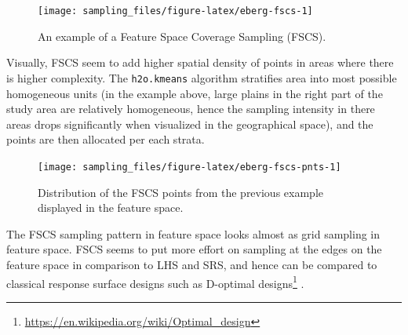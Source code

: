 \documentclass[
  graybox,natbib,nospthms]{svmono}
\newenvironment{Shaded}{\begin{snugshade}}{\end{snugshade}}
\newcommand{\AttributeTok}[1]{\textcolor[rgb]{0.61,0.61,0.61}{#1}}
\newcommand{\FunctionTok}[1]{\textcolor[rgb]{0,0,0}{#1}}
\newcommand{\NormalTok}[1]{#1}
\newcommand{\OtherTok}[1]{\textcolor[rgb]{0.37,0.37,0.37}{#1}}
\newcommand{\SpecialCharTok}[1]{\textcolor[rgb]{0,0,0}{#1}}
\newcommand{\StringTok}[1]{\textcolor[rgb]{0.5,0.5,0.5}{#1}}
\renewcommand{\href}[2]{#2 (\url{#1})}
\renewcommand{\href}[2]{#2\footnote{\url{#1}}}
\begin{document}
\begin{figure}

{\centering \texttt{[image: sampling\_files/figure-latex/eberg-fscs-1]} 

}

\caption{An example of a Feature Space Coverage Sampling (FSCS).}\label{fig:eberg-fscs}
\end{figure}

Visually, FSCS seem to add higher spatial density of points in areas where there
is higher complexity. The \texttt{h2o.kmeans} algorithm stratifies area into most
possible homogeneous units (in the example above, large plains in the right
part of the study area are relatively homogeneous, hence the sampling intensity
in there areas drops significantly when visualized in the geographical space),
and the points are then allocated per each strata.

\begin{Shaded}
\end{Shaded}

\begin{figure}

{\centering \texttt{[image: sampling\_files/figure-latex/eberg-fscs-pnts-1]} 

}

\caption{Distribution of the FSCS points from the previous example displayed in the feature space.}\label{fig:eberg-fscs-pnts}
\end{figure}

The FSCS sampling pattern in feature space looks almost as grid sampling in feature
space. FSCS seems to put more effort on sampling at the edges on the feature space
in comparison to LHS and SRS, and hence can be compared to classical response
surface designs such as \href{https://en.wikipedia.org/wiki/Optimal_design}{D-optimal designs} \citep{Hengl2004AJSR}.
\end{document}
